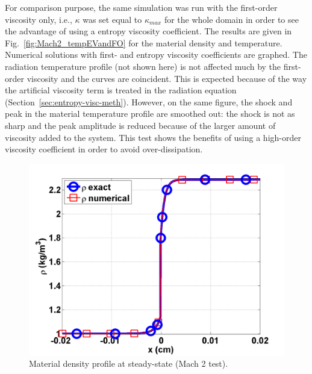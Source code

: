 \documentclass[review]{elsarticle}
\newcommand{\fig}[1]{Fig.~\ref{#1}}                      %
\newcommand{\sect}[1]{Section~\ref{#1}}                     %
\begin{document}
For comparison purpose, the same simulation was run with the first-order viscosity only, i.e., $\kappa$ was set equal to $\kappa_{max}$ for the whole domain in order to see the advantage of using a entropy viscosity coefficient. The results are given in \fig{fig:Mach2_tempEVandFO} for the material density and temperature. Numerical solutions with first- and entropy viscosity coefficients are graphed. The radiation temperature profile (not shown here) is not affected much by the first-order viscosity and the curves are coincident. This is expected because of the way the artificial viscosity term is treated in the radiation equation (\sect{sec:entropy-visc-meth}). However, on the same figure, the shock and peak in the material temperature profile are smoothed out: the shock is not as sharp and the peak amplitude is reduced because of the larger amount of viscosity added to the system. This test shows the benefits of using a high-order viscosity coefficient in order to avoid over-dissipation.
\begin{figure}[H]
                \centering
                \includegraphics[width=\textwidth]{figs/Mach_2_nel_2000_density.png}
        \caption{Material density profile at steady-state (Mach 2 test).}\label{fig:Mach2_density}
\end{figure}
\end{document}
